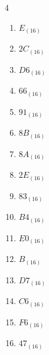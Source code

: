 \begin{multicols}{4}
\begin{enumerate}
  \item $E_{(16)}$

        \phantom{$=14$}

  \item $2C_{(16)}$

        \phantom{$=44$}

  \item $D6_{(16)}$

        \phantom{$=214$}

  \item $66_{(16)}$

        \phantom{$=102$}

  \item $91_{(16)}$

        \phantom{$=145$}

  \item $8B_{(16)}$

        \phantom{$=139$}

  \item $8A_{(16)}$

        \phantom{$=138$}

  \item $2E_{(16)}$

        \phantom{$=46$}

\columnbreak %

  \item $83_{(16)}$

        \phantom{$=131$}

  \item $B4_{(16)}$

        \phantom{$=180$}

  \item $E0_{(16)}$

        \phantom{$=224$}

  \item $B_{(16)}$

        \phantom{$=11$}

  \item $D7_{(16)}$

        \phantom{$=215$}

  \item $C6_{(16)}$

        \phantom{$=198$}

  \item $F6_{(16)}$

        \phantom{$=246$}

  \item $47_{(16)}$


\end{enumerate}
\end{multicols}
